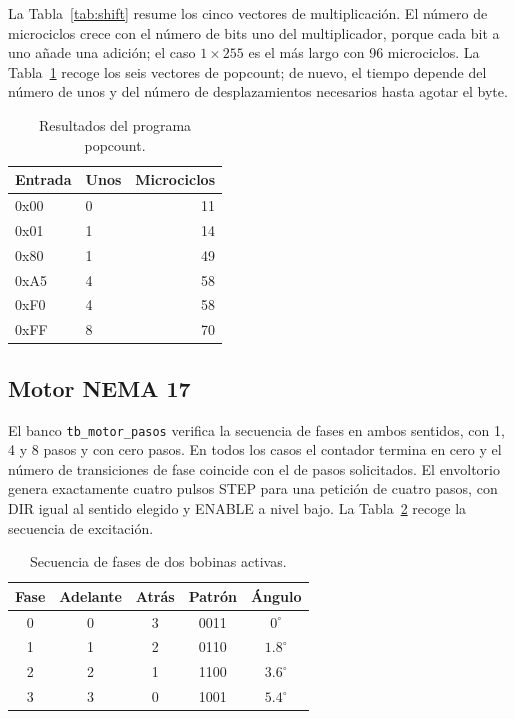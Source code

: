 \documentclass[llncs]{llncs}
\begin{document}
La Tabla~\ref{tab:shift} resume los cinco vectores de multiplicación. El número
de microciclos crece con el número de bits uno del multiplicador, porque cada
bit a uno añade una adición; el caso $1\times255$ es el más largo con 96
microciclos. La Tabla~\ref{tab:pop} recoge los seis vectores de popcount; de
nuevo, el tiempo depende del número de unos y del número de desplazamientos
necesarios hasta agotar el byte.

\begin{table}[t]
\centering
\caption{Resultados del programa popcount.}
\label{tab:pop}
\begin{tabular}{@{}llr@{}}
\toprule
Entrada & Unos & Microciclos \\
\midrule
0x00 & 0 & 11 \\
0x01 & 1 & 14 \\
0x80 & 1 & 49 \\
0xA5 & 4 & 58 \\
0xF0 & 4 & 58 \\
0xFF & 8 & 70 \\
\bottomrule
\end{tabular}
\end{table}

\subsection{Motor NEMA 17}

El banco \texttt{tb\_motor\_pasos} verifica la secuencia de fases en ambos
sentidos, con 1, 4 y 8 pasos y con cero pasos. En todos los casos el contador
termina en cero y el número de transiciones de fase coincide con el de pasos
solicitados. El envoltorio genera exactamente cuatro pulsos STEP para una
petición de cuatro pasos, con DIR igual al sentido elegido y ENABLE a nivel
bajo. La Tabla~\ref{tab:motor} recoge la secuencia de excitación.

\begin{table}[t]
\centering
\caption{Secuencia de fases de dos bobinas activas.}
\label{tab:motor}
\begin{tabular}{@{}ccccc@{}}
\toprule
Fase & Adelante & Atrás & Patrón & Ángulo \\
\midrule
0 & 0 & 3 & 0011 & $0^\circ$ \\
1 & 1 & 2 & 0110 & $1.8^\circ$ \\
2 & 2 & 1 & 1100 & $3.6^\circ$ \\
3 & 3 & 0 & 1001 & $5.4^\circ$ \\
\bottomrule
\end{tabular}
\end{table}
\end{document}
